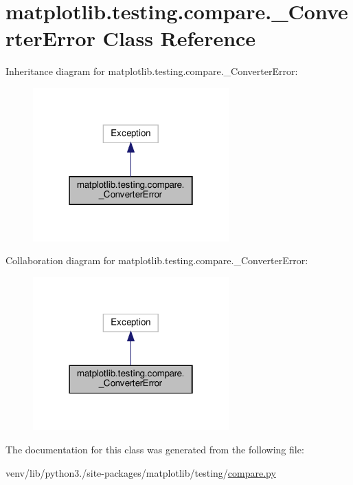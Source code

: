 \hypertarget{classmatplotlib_1_1testing_1_1compare_1_1__ConverterError}{}\section{matplotlib.\+testing.\+compare.\+\_\+\+Converter\+Error Class Reference}
\label{classmatplotlib_1_1testing_1_1compare_1_1__ConverterError}


Inheritance diagram for matplotlib.\+testing.\+compare.\+\_\+\+Converter\+Error\+:
\nopagebreak
\begin{figure}[H]
\begin{center}
\leavevmode
\includegraphics[width=214pt]{classmatplotlib_1_1testing_1_1compare_1_1__ConverterError__inherit__graph}
\end{center}
\end{figure}


Collaboration diagram for matplotlib.\+testing.\+compare.\+\_\+\+Converter\+Error\+:
\nopagebreak
\begin{figure}[H]
\begin{center}
\leavevmode
\includegraphics[width=214pt]{classmatplotlib_1_1testing_1_1compare_1_1__ConverterError__coll__graph}
\end{center}
\end{figure}


The documentation for this class was generated from the following file\+:\begin{DoxyCompactItemize}
\item 
venv/lib/python3./site-\/packages/matplotlib/testing/\hyperlink{compare_8py}{compare.\+py}\end{DoxyCompactItemize}
